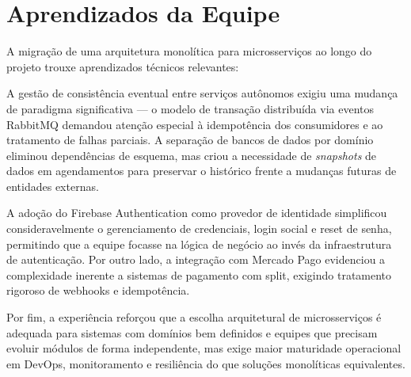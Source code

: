 \documentclass[
    12pt, 
    a4paper, 
    oneside, 
    chapter=TITLE, 
    section=TITLE
]{abntex2}
\begin{document}
\section{Aprendizados da Equipe}
A migração de uma arquitetura monolítica para microsserviços ao longo do projeto trouxe aprendizados técnicos relevantes:

A gestão de consistência eventual entre serviços autônomos exigiu uma mudança de paradigma significativa — o modelo de transação distribuída via eventos RabbitMQ demandou atenção especial à idempotência dos consumidores e ao tratamento de falhas parciais. A separação de bancos de dados por domínio eliminou dependências de esquema, mas criou a necessidade de \textit{snapshots} de dados em agendamentos para preservar o histórico frente a mudanças futuras de entidades externas.

A adoção do Firebase Authentication como provedor de identidade simplificou consideravelmente o gerenciamento de credenciais, login social e reset de senha, permitindo que a equipe focasse na lógica de negócio ao invés da infraestrutura de autenticação. Por outro lado, a integração com Mercado Pago evidenciou a complexidade inerente a sistemas de pagamento com split, exigindo tratamento rigoroso de webhooks e idempotência.

Por fim, a experiência reforçou que a escolha arquitetural de microsserviços é adequada para sistemas com domínios bem definidos e equipes que precisam evoluir módulos de forma independente, mas exige maior maturidade operacional em DevOps, monitoramento e resiliência do que soluções monolíticas equivalentes.

\postextual
\end{document}
